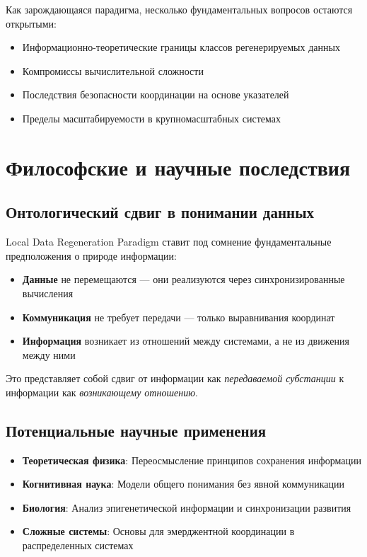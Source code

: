 \documentclass[11pt,a4paper]{article}
\begin{document}
Как зарождающаяся парадигма, несколько фундаментальных вопросов остаются открытыми:
\begin{itemize}
    \item Информационно-теоретические границы классов регенерируемых данных
    \item Компромиссы вычислительной сложности
    \item Последствия безопасности координации на основе указателей
    \item Пределы масштабируемости в крупномасштабных системах
\end{itemize}

\section{Философские и научные последствия}

\subsection{Онтологический сдвиг в понимании данных}

Local Data Regeneration Paradigm ставит под сомнение фундаментальные предположения о природе информации:

\begin{itemize}
    \item \textbf{Данные} не перемещаются — они реализуются через синхронизированные вычисления
    \item \textbf{Коммуникация} не требует передачи — только выравнивания координат
    \item \textbf{Информация} возникает из отношений между системами, а не из движения между ними
\end{itemize}

Это представляет собой сдвиг от информации как \emph{передаваемой субстанции} к информации как \emph{возникающему отношению}.

\subsection{Потенциальные научные применения}

\begin{itemize}
    \item \textbf{Теоретическая физика}: Переосмысление принципов сохранения информации
    \item \textbf{Когнитивная наука}: Модели общего понимания без явной коммуникации
    \item \textbf{Биология}: Анализ эпигенетической информации и синхронизации развития
    \item \textbf{Сложные системы}: Основы для эмерджентной координации в распределенных системах
\end{itemize}
\end{document}
